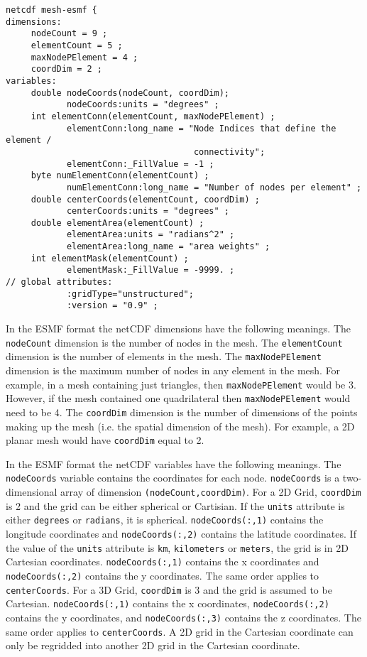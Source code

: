 \begin{verbatim}
netcdf mesh-esmf {
dimensions:
     nodeCount = 9 ;
     elementCount = 5 ;
     maxNodePElement = 4 ;
     coordDim = 2 ;
variables:
     double nodeCoords(nodeCount, coordDim);
            nodeCoords:units = "degrees" ;
     int elementConn(elementCount, maxNodePElement) ;
            elementConn:long_name = "Node Indices that define the element /
                                     connectivity";
            elementConn:_FillValue = -1 ;
     byte numElementConn(elementCount) ;
            numElementConn:long_name = "Number of nodes per element" ;
     double centerCoords(elementCount, coordDim) ;
            centerCoords:units = "degrees" ;
     double elementArea(elementCount) ;
            elementArea:units = "radians^2" ;
            elementArea:long_name = "area weights" ;
     int elementMask(elementCount) ;
            elementMask:_FillValue = -9999. ;
// global attributes:
            :gridType="unstructured";
            :version = "0.9" ;
\end{verbatim}

 In the ESMF format the netCDF dimensions have the following meanings. The {\tt nodeCount} dimension is the number of nodes in the mesh.
 The {\tt elementCount} dimension is the number of elements in the mesh. The {\tt maxNodePElement} dimension is the maximum number
 of nodes in any element in the mesh. For example, in a mesh containing just triangles, then {\tt maxNodePElement} would be 3. However,
 if the mesh contained one quadrilateral then {\tt maxNodePElement} would need to be 4. The {\tt coordDim} dimension is the number of dimensions
 of the points making up the mesh (i.e. the spatial dimension of the mesh). For example, a 2D planar mesh would have {\tt coordDim} equal to 2.

 In the ESMF format the netCDF variables have the following meanings. The {\tt nodeCoords} variable contains the coordinates for each node.
 {\tt nodeCoords} is a two-dimensional array of dimension {\tt (nodeCount,coordDim)}.
 For a 2D Grid, {\tt coordDim} is 2 and the grid can be either spherical or Cartisian. If the {\tt units}
 attribute is either {\tt degrees} or {\tt radians}, it is spherical. {\tt nodeCoords(:,1)} contains 
the longitude coordinates and {\tt nodeCoords(:,2)} contains the latitude coordinates.  If the value of 
the {\tt units} attribute is {\tt km}, {\tt kilometers} or {\tt meters}, the grid is in 2D Cartesian 
coordinates. {\tt nodeCoords(:,1)} contains the x coordinates and
 {\tt nodeCoords(:,2)} contains the y coordinates.
 The same order applies to {\tt centerCoords}.
 For a 3D Grid, {\tt coordDim} is 3 and the grid is assumed to be Cartesian. {\tt nodeCoords(:,1)} contains the x coordinates, {\tt nodeCoords(:,2)} contains the y coordinates, 
 and {\tt nodeCoords(:,3)} contains the z coordinates.  The same order applies to {\tt centerCoords}.
A 2D grid in the Cartesian coordinate can only be regridded into another 2D grid in the Cartesian coordinate.
 
